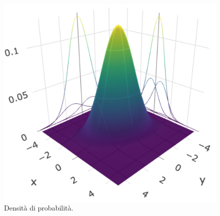 {\begin{frame}
\begin{block}
\begin{figure}[!htbp]
\begin{columns}
				\includegraphics[width=0.85\linewidth]{images/unsupervised/gaussian_mixture/multivariate_normal_2.png}
				\caption{Densità di probabilità.}
			\end{columns}
			
			
		\end{figure}
	\end{block}

\end{frame}

}{}


